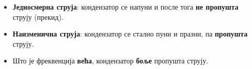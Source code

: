 \documentclass{article}
\begin{document}
\begin{tcolorbox}[colback=blue!5, colframe=blue!60, title=Важно]
    \begin{itemize}
        \item \textbf{Једносмерна струја}: кондензатор се напуни и после тога \textbf{не пропушта} струју (прекид).
        \item \textbf{Наизменична струја}: кондензатор се стално пуни и празни, па \textbf{пропушта} струју.
        \item Што је фреквенција \textbf{већа}, кондензатор \textbf{боље} пропушта струју.
    \end{itemize}
\end{tcolorbox}
\end{document}
